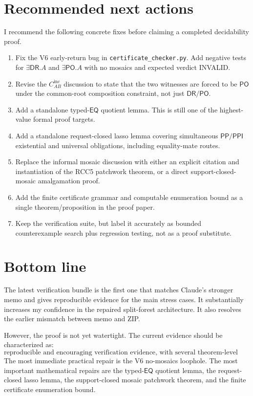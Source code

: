 \documentclass[11pt]{article}
\newcommand{\PP}{\mathsf{PP}}
\newcommand{\PPI}{\mathsf{PPI}}
\newcommand{\DR}{\mathsf{DR}}
\newcommand{\PO}{\mathsf{PO}}
\newcommand{\EQ}{\mathsf{EQ}}
\begin{document}
\section{Recommended next actions}

I recommend the following concrete fixes before claiming a completed decidability proof.

\begin{enumerate}[leftmargin=2em]
  \item Fix the V6 early-return bug in \texttt{certificate\_checker.py}.  Add negative tests for \(\exists\DR.A\) and \(\exists\PO.A\) with no mosaics and expected verdict INVALID.

  \item Revise the \(C_{AB}^{\mathrm{inc}}\) discussion to state that the two witnesses are forced to be \(\PO\) under the common-root composition constraint, not just \(\DR/\PO\).

  \item Add a standalone typed-\(\EQ\) quotient lemma.  This is still one of the highest-value formal proof targets.

  \item Add a standalone request-closed lasso lemma covering simultaneous \(\PP/\PPI\) existential and universal obligations, including equality-mate routes.

  \item Replace the informal mosaic discussion with either an explicit citation and instantiation of the RCC5 patchwork theorem, or a direct support-closed-mosaic amalgamation proof.

  \item Add the finite certificate grammar and computable enumeration bound as a single theorem/proposition in the proof paper.

  \item Keep the verification suite, but label it accurately as bounded counterexample search plus regression testing, not as a proof substitute.
\end{enumerate}

\section{Bottom line}

The latest verification bundle is the first one that matches Claude's stronger memo and gives reproducible evidence for the main stress cases.  It substantially increases my confidence in the repaired split-forest architecture.  It also resolves the earlier mismatch between memo and ZIP.

However, the proof is not yet watertight.  The current evidence should be characterized as:
\[
\boxed{\text{reproducible and encouraging verification evidence, with several theorem-level gaps still open.}}
\]
The most immediate practical repair is the V6 no-mosaics loophole.  The most important mathematical repairs are the typed-\(\EQ\) quotient lemma, the request-closed lasso lemma, the support-closed mosaic patchwork theorem, and the finite certificate enumeration bound.
\end{document}
